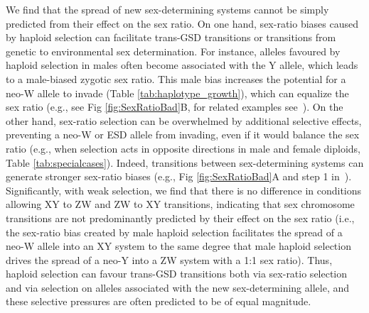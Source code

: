 \documentclass[10pt,letterpaper]{article}
\begin{document}
We find that the spread of new sex-determining systems cannot be simply predicted from their effect on the sex ratio. 
On one hand, sex-ratio biases caused by haploid selection can facilitate trans-GSD transitions or transitions from genetic to environmental sex determination. 
For instance, alleles favoured by haploid selection in males often become associated with the Y allele, which leads to a male-biased zygotic sex ratio.
This male bias increases the potential for a neo-W allele to invade (Table \ref{tab:haplotype_growth}), which can equalize the sex ratio (e.g., see Fig \ref{fig:SexRatioBad}B, for related examples see~\cite{Kozielska:2010vm}).
On the other hand, sex-ratio selection can be overwhelmed by additional selective effects, preventing a neo-W or ESD allele from invading, even if it would balance the sex ratio (e.g., when selection acts in opposite directions in male and female diploids, Table \ref{tab:specialcases}). %
Indeed, transitions between sex-determining systems can generate stronger sex-ratio biases (e.g., Fig \ref{fig:SexRatioBad}A and step 1 in~\cite{Ubeda:2015fx}).
Significantly, with weak selection, we find that there is no difference in conditions allowing XY to ZW and ZW to XY transitions, indicating that sex chromosome transitions are not predominantly predicted by their effect on the sex ratio (i.e., the sex-ratio bias created by male haploid selection facilitates the spread of a neo-W allele into an XY system to the same degree that male haploid selection drives the spread of a neo-Y into a ZW system with a 1:1 sex ratio). 
Thus, haploid selection can favour trans-GSD transitions both via sex-ratio selection and via selection on alleles associated with the new sex-determining allele, and these selective pressures are often predicted to be of equal magnitude. 
\end{document}
